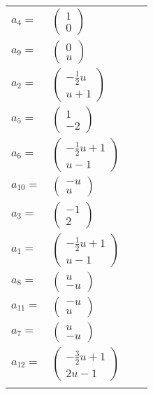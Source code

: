 \documentclass[1p]{elsarticle_modified}
\theoremstyle{definition}
\begin{document}
\begin{tabular}{m{7pt} m{180pt} m{7pt} m{180pt} }
\flushright $a_{4}=$&$\begin{pmatrix}1\\0\end{pmatrix}$ \\
\flushright $a_{9}=$&$\begin{pmatrix}0\\u\end{pmatrix}$ \\
\flushright $a_{2}=$&$\begin{pmatrix}-\frac{1}{2} u\\u+1\end{pmatrix}$ \\
\flushright $a_{5}=$&$\begin{pmatrix}1\\-2\end{pmatrix}$ \\
\flushright $a_{6}=$&$\begin{pmatrix}-\frac{1}{2} u+1\\u-1\end{pmatrix}$ \\
\flushright $a_{10}=$&$\begin{pmatrix}- u\\u\end{pmatrix}$ \\
\flushright $a_{3}=$&$\begin{pmatrix}-1\\2\end{pmatrix}$ \\
\flushright $a_{1}=$&$\begin{pmatrix}-\frac{1}{2} u+1\\u-1\end{pmatrix}$ \\
\flushright $a_{8}=$&$\begin{pmatrix}u\\- u\end{pmatrix}$ \\
\flushright $a_{11}=$&$\begin{pmatrix}- u\\u\end{pmatrix}$ \\
\flushright $a_{7}=$&$\begin{pmatrix}u\\- u\end{pmatrix}$ \\
\flushright $a_{12}=$&$\begin{pmatrix}-\frac{3}{2} u+1\\2 u-1\end{pmatrix}$\\&\end{tabular}
\end{document}
